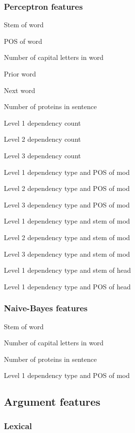 \documentclass{article} %
\begin{document}
\subsubsection{Perceptron features}
\begin{itemize*}
\item Stem of word
\item POS of word
\item Number of capital letters in word
\item Prior word
\item Next word
\item Number of proteins in sentence
\item Level 1 dependency count
\item Level 2 dependency count
\item Level 3 dependency count
\item Level 1 dependency type and POS of mod
\item Level 2 dependency type and POS of mod
\item Level 3 dependency type and POS of mod
\item Level 1 dependency type and stem of mod
\item Level 2 dependency type and stem of mod
\item Level 3 dependency type and stem of mod
\item Level 1 dependency type and stem of head
\item Level 1 dependency type and POS of head
\end{itemize*}


\subsubsection{Naive-Bayes features}
\begin{itemize*}
\item Stem of word
\item Number of capital letters in word
\item Number of proteins in sentence
\item Level 1 dependency type and POS of mod
\end{itemize*}


\subsection{Argument features}

\subsubsection{Lexical}
\end{document}
